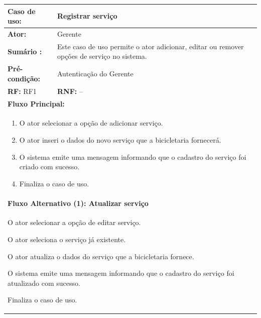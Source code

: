 \documentclass[
	12pt,				%
	openright,
	oneside,			%
	a4paper,			%
	chapter=TITLE,		%
	brazil				%
	]{abntex2}
\begin{document}
\begin{table}[h]
\centering
\begin{tabular}{|p{3cm}|p{3cm}|p{3cm}|p{3cm}|}
\hline
\textbf{Caso de uso:}             & \multicolumn{3}{p{9cm}|}{Registrar serviço}				 \\ \hline
\textbf{Ator:}                 & \multicolumn{3}{p{9cm}|}{Gerente}         			          						 	\\ \hline
\textbf{Sumário :}                & \multicolumn{3}{p{9cm}|}{Este caso de uso permite o ator adicionar, editar ou remover opções de serviço no sistema.}         	\\ \hline
\textbf{Pré-condição:}            & \multicolumn{3}{p{9cm}|}{ Autenticação do Gerente }                                   				    \\ \hline
\multicolumn{2}{|p{6cm}|}{\textbf{RF:} RF1 }                  & \multicolumn{2}{p{6cm}|}{\textbf{RNF:} --}     	    \\ \hline
\multicolumn{4}{|p{12cm}|}{\textbf{Fluxo Principal:}}                                                					\\ \hline
\multicolumn{4}{|p{12cm}|}{%
\begin{enumerate}
  \item O ator selecionar a opção de adicionar serviço.
  \item O ator inseri o dados do novo serviço que a bicicletaria fornecerá.
  \item O sistema emite uma mensagem informando que o cadastro do serviço foi criado com sucesso.
  \item Finaliza o caso de uso.
\end{enumerate}}                                                               				 							\\ \hline

\multicolumn{4}{|p{12cm}|}{\textbf{Fluxo Alternativo (1): Atualizar serviço}}                              					\\ \hline
\multicolumn{4}{|p{12cm}|}{%
\begin{alineas}
	\item O ator selecionar a opção de editar serviço.
  	\item O ator seleciona o serviço já existente.
	\item O ator atualiza o dados do serviço que a bicicletaria fornece.
	\item O sistema emite uma mensagem informando que o cadastro do serviço foi atualizado com sucesso.
	\item Finaliza o caso de uso.
\end{alineas}}                                                               				 							\\ \hline


\end{tabular}
\end{table}
\end{document}

